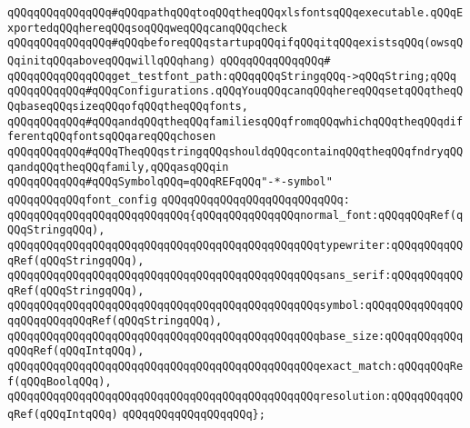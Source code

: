 \newline
\verb|qQQqqQQqqQQqqQQq#qQQqpathqQQqtoqQQqtheqQQqxlsfontsqQQqexecutable.qQQqExportedqQQqhereqQQqsoqQQqweqQQqcanqQQqcheck|\newline
\verb|qQQqqQQqqQQqqQQq#qQQqbeforeqQQqstartupqQQqifqQQqitqQQqexistsqQQq(owsqQQqinitqQQqaboveqQQqwillqQQqhang)|\newline
\verb|qQQqqQQqqQQqqQQq#|\newline
\verb|qQQqqQQqqQQqqQQqget_testfont_path:qQQqqQQqStringqQQq->qQQqString;qQQq|\newline
\newline
\verb|qQQqqQQqqQQq#qQQqConfigurations.qQQqYouqQQqcanqQQqhereqQQqsetqQQqtheqQQqbaseqQQqsizeqQQqofqQQqtheqQQqfonts,|\newline
\verb|qQQqqQQqqQQq#qQQqandqQQqtheqQQqfamiliesqQQqfromqQQqwhichqQQqtheqQQqdifferentqQQqfontsqQQqareqQQqchosen|\newline
\verb|qQQqqQQqqQQq#qQQqTheqQQqstringqQQqshouldqQQqcontainqQQqtheqQQqfndryqQQqandqQQqtheqQQqfamily,qQQqasqQQqin|\newline
\verb|qQQqqQQqqQQq#qQQqSymbolqQQq=qQQqREFqQQq"-*-symbol"|\newline
\newline
\newline
\verb|qQQqqQQqqQQqfont_config|\newline
\verb|qQQqqQQqqQQqqQQqqQQqqQQqqQQq:|\newline
\verb|qQQqqQQqqQQqqQQqqQQqqQQqqQQq{qQQqqQQqqQQqqQQqnormal_font:qQQqqQQqRef(qQQqStringqQQq),|\newline
\verb|qQQqqQQqqQQqqQQqqQQqqQQqqQQqqQQqqQQqqQQqqQQqqQQqtypewriter:qQQqqQQqqQQqRef(qQQqStringqQQq),|\newline
\verb|qQQqqQQqqQQqqQQqqQQqqQQqqQQqqQQqqQQqqQQqqQQqqQQqsans_serif:qQQqqQQqqQQqRef(qQQqStringqQQq),|\newline
\verb|qQQqqQQqqQQqqQQqqQQqqQQqqQQqqQQqqQQqqQQqqQQqqQQqsymbol:qQQqqQQqqQQqqQQqqQQqqQQqqQQqRef(qQQqStringqQQq),|\newline
\verb|qQQqqQQqqQQqqQQqqQQqqQQqqQQqqQQqqQQqqQQqqQQqqQQqbase_size:qQQqqQQqqQQqqQQqRef(qQQqIntqQQq),|\newline
\verb|qQQqqQQqqQQqqQQqqQQqqQQqqQQqqQQqqQQqqQQqqQQqqQQqexact_match:qQQqqQQqRef(qQQqBoolqQQq),|\newline
\verb|qQQqqQQqqQQqqQQqqQQqqQQqqQQqqQQqqQQqqQQqqQQqqQQqresolution:qQQqqQQqqQQqRef(qQQqIntqQQq)|\newline
\verb|qQQqqQQqqQQqqQQqqQQq};|\newline
\newline
